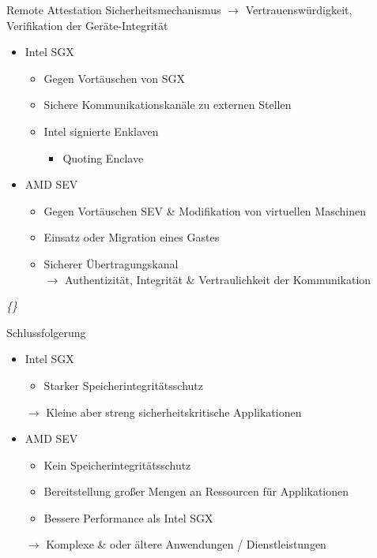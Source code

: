 \documentclass{sdqbeamer}
\begin{document}
\begin{frame}{Remote Attestation}
	Sicherheitsmechanismus \(\rightarrow\) Vertrauenswürdigkeit, Verifikation der Geräte-Integrität
	\begin{itemize}
		\item Intel SGX
		\begin{itemize}
			\item Gegen Vortäuschen von SGX
			\item Sichere Kommunikationskanäle zu externen Stellen
			\item Intel signierte Enklaven
			\begin{itemize}
				\item Quoting Enclave 
			\end{itemize}
		\end{itemize}
		\item AMD SEV
		\begin{itemize}
			\item Gegen Vortäuschen SEV \& Modifikation von virtuellen Maschinen
			\item Einsatz oder Migration eines Gastes
			\item Sicherer Übertragungskanal\\
				\(\rightarrow\) Authentizität, Integrität \& Vertraulichkeit der Kommunikation
		\end{itemize}
	\end{itemize}
	\vfill
	\small\textit{\{\cite{knauth, swami, buhren}\}}
\end{frame}

\begin{frame}{Schlussfolgerung}
	\begin{itemize}
		\item Intel SGX
		\begin{itemize}
			\item Starker Speicherintegritätsschutz
		\end{itemize}
			\(\rightarrow\) Kleine aber streng sicherheitskritische Applikationen
		\item AMD SEV
		\begin{itemize}
			\item Kein Speicherintegritätsschutz
			\item Bereitstellung großer Mengen an Ressourcen für Applikationen
			\item Bessere Performance als Intel SGX
		\end{itemize}
			\(\rightarrow\) Komplexe \& oder ältere Anwendungen / Dienstleistungen
	\end{itemize}
\end{frame}
\end{document}
